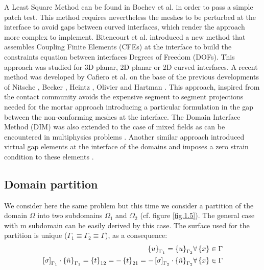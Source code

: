  A Least Square Method can be found in Bochev et al. \cite{bochev2007least} in order to pass a simple patch test. This method requires nevertheless the meshes to be perturbed at the interface to avoid gaps between curved interfaces, which render the approach more complex to implement.
 Bitencourt et al. \cite{bitencourt2015coupling} introduced a new method that assembles Coupling Finite Elements (CFEs) at the interface to build the constraints equation between interfaces Degrees of Freedom (DOFs). This approach was studied for 3D planar, 2D planar or 2D curved interfaces. 
 A recent method was developed by Cafiero et al. \cite{cafiero2016domain} on the base of the previous developments of Nitsche  \cite{nitsche1971variationsprinzip}, Becker \cite{becker2003finite}, Heintz \cite{heintz2006stabilized} , Olivier \cite{oliver2009contact} and Hartman \cite{hartmann2009contact}. This approach, inspired from the contact community avoids the expensive segment to segment projections needed for the mortar approach introducing a particular formulation in the gap between the non-conforming meshes at the interface. The Domain Interface Method (DIM) \cite{cafiero2016domain} was also extended to the case of mixed fields as can be encountered in multiphysics problems \cite{lloberas2017domain}. Another similar approach introduced virtual gap elements at the interface of the domains and imposes a zero strain condition to these elements \cite{song2017virtual}.
 \\
 \subsection{Domain partition}\label{ssec22}
 We consider here the same problem but this time we consider a partition of the domain $\Omega$ into two subdomains $\Omega_1$ and $\Omega_2$ (cf. figure \ref{fig.1.5}). The general case with m subdomain can be easily derived by this case. The surface used for the partition is unique  ($\Gamma_1 \equiv \Gamma_2 \equiv \Gamma$), as a consequence:
 \begin{eqnarray}
 \label{eq.13}
 \left\lbrace{u}\right \rbrace_{\Gamma_1}=\left\lbrace{u}\right \rbrace_{\Gamma_2} & \forall \left\lbrace{x}\right \rbrace \in \Gamma\\
 \label{eq.14}
 \left[{\sigma}\right]_{\Gamma_1}\cdot\left\lbrace{\hat{n}}\right \rbrace_{\Gamma_1}=\left\lbrace{t}\right \rbrace_{12}=-\left\lbrace{t}\right \rbrace_{21}=-\left[{\sigma}\right]_{\Gamma_2}\cdot\left\lbrace{\hat{n}}\right \rbrace_{\Gamma_2} & \forall \left\lbrace{x}\right \rbrace \in \Gamma
 \end{eqnarray}
 
